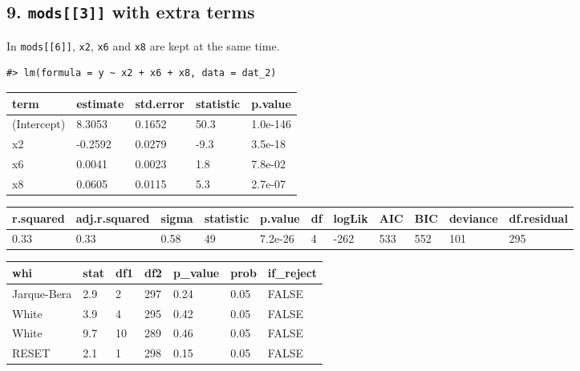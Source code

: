\documentclass[main.tex]{subfiles}
\begin{document}
\hypertarget{mods3-with-extra-terms}{%
\subsection{\texorpdfstring{9. \texttt{mods{[}{[}3{]}{]}} with extra
terms}{9. mods{[}{[}3{]}{]} with extra terms}}\label{mods3-with-extra-terms}}

In \texttt{mods{[}{[}6{]}{]}}, \texttt{x2}, \texttt{x6} and \texttt{x8}
are kept at the same time.

\begin{verbatim}
#> lm(formula = y ~ x2 + x6 + x8, data = dat_2)
\end{verbatim}

\begin{table}[H]
\centering
\begin{tabular}{lllll}
\toprule
term & estimate & std.error & statistic & p.value\\
\midrule
(Intercept) & 8.3053 & 0.1652 & 50.3 & 1.0e-146\\
x2 & -0.2592 & 0.0279 & -9.3 & 3.5e-18\\
x6 & 0.0041 & 0.0023 & 1.8 & 7.8e-02\\
x8 & 0.0605 & 0.0115 & 5.3 & 2.7e-07\\
\bottomrule
\end{tabular}
\end{table}

\begin{table}[H]
\centering
\begin{tabular}{lllllllllll}
\toprule
r.squared & adj.r.squared & sigma & statistic & p.value & df & logLik & AIC & BIC & deviance & df.residual\\
\midrule
0.33 & 0.33 & 0.58 & 49 & 7.2e-26 & 4 & -262 & 533 & 552 & 101 & 295\\
\bottomrule
\end{tabular}
\end{table}

\begin{table}[H]
\centering
\begin{tabular}{lllllll}
\toprule
whi & stat & df1 & df2 & p\_value & prob & if\_reject\\
\midrule
Jarque-Bera & 2.9 & 2 & 297 & 0.24 & 0.05 & FALSE\\
White & 3.9 & 4 & 295 & 0.42 & 0.05 & FALSE\\
White & 9.7 & 10 & 289 & 0.46 & 0.05 & FALSE\\
RESET & 2.1 & 1 & 298 & 0.15 & 0.05 & FALSE\\
\bottomrule
\end{tabular}
\end{table}
\end{document}
